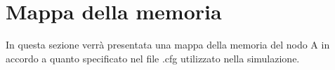 \documentclass{article}
\begin{document}




\section{Mappa della memoria}
In questa sezione verrà presentata una mappa della memoria del nodo A in accordo a quanto specificato nel file .cfg utilizzato nella simulazione.
\end{document}
